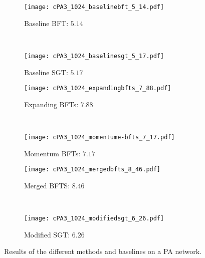 \documentclass[a4paper,final,notitlepage,11pt,svgnames]{scrartcl}
\begin{document}
\begin{figure}[htpb]
	\centering
	\begin{subfigure}[b]{0.45\textwidth}
		\texttt{[image: cPA3\_1024\_baselinebft\_5\_14.pdf]}
		\caption{Baseline BFT: $5.14$}
	\end{subfigure}~
	\begin{subfigure}[b]{0.45\textwidth}
		\texttt{[image: cPA3\_1024\_baselinesgt\_5\_17.pdf]}
		\caption{Baseline SGT: $5.17$}
	\end{subfigure}

	\begin{subfigure}[b]{0.45\textwidth}
		\texttt{[image: cPA3\_1024\_expandingbfts\_7\_88.pdf]}
		\caption{Expanding BFTs: $7.88$}
	\end{subfigure}~
	\begin{subfigure}[b]{0.45\textwidth}
		\texttt{[image: cPA3\_1024\_momentume-bfts\_7\_17.pdf]}
		\caption{Momentum BFTs: $7.17$}
	\end{subfigure}

	\begin{subfigure}[b]{0.45\textwidth}
		\texttt{[image: cPA3\_1024\_mergedbfts\_8\_46.pdf]}
		\caption{Merged BFTS: $8.46$}
	\end{subfigure}~
	\begin{subfigure}[b]{0.45\textwidth}
		\texttt{[image: cPA3\_1024\_modifiedsgt\_6\_26.pdf]}
		\caption{Modified SGT: $6.26$}
	\end{subfigure}
	\caption{Results of the different methods and baselines on a PA network.
		\label{fig:rpa}}
\end{figure}
\end{document}
